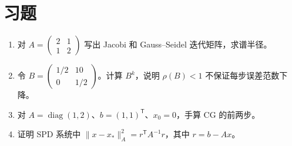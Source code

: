 \section{习题}
\begin{enumerate}[label=\arabic*.]
\item\label{exr:na-iter-jacobi} 对 $A=\begin{pmatrix}2&1\\1&2\end{pmatrix}$ 写出 Jacobi 和 Gauss--Seidel 迭代矩阵，求谱半径。
\item\label{exr:na-iter-nonnormal} 令 $B=\begin{pmatrix}1/2&10\\0&1/2\end{pmatrix}$。计算 $B^k$，说明 $\rho(B)<1$ 不保证每步误差范数下降。
\item\label{exr:na-iter-cg} 对 $A=\operatorname{diag}(1,2)$、$b=(1,1)^{\mathsf T}$、$x_0=0$，手算 CG 的前两步。
\item\label{exr:na-iter-energy} 证明 SPD 系统中 $\|x-x_*\|_A^2=r^{\mathsf T}A^{-1}r$，其中 $r=b-Ax$。
\end{enumerate}

